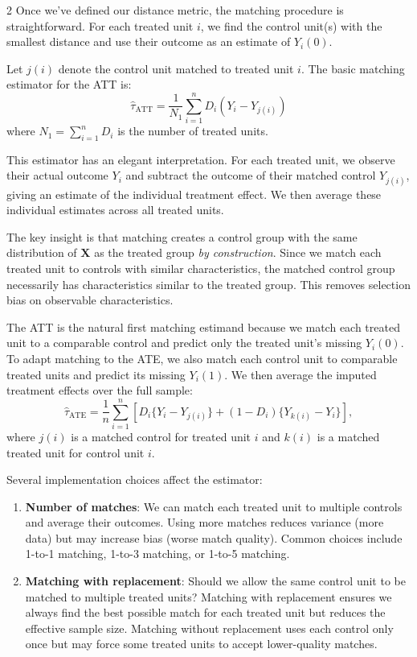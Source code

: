 \documentclass[12pt]{article}
\begin{document}
\begin{multicols}{2}
Once we've defined our distance metric, the matching procedure is straightforward.
For each treated unit $i$, we find the control unit(s) with the smallest distance and use their outcome as an estimate of $Y_i(0)$.

Let $j(i)$ denote the control unit matched to treated unit $i$.
The basic matching estimator for the ATT is:
$$\hat{\tau}_{\text{ATT}} = \frac{1}{N_1} \sum_{i=1}^n D_i (Y_i - Y_{j(i)})$$
where $N_1 = \sum_{i=1}^n D_i$ is the number of treated units.

This estimator has an elegant interpretation.
For each treated unit, we observe their actual outcome $Y_i$ and subtract the outcome of their matched control $Y_{j(i)}$, giving an estimate of the individual treatment effect.
We then average these individual estimates across all treated units.

The key insight is that matching creates a control group with the same distribution of $\bm{X}$ as the treated group \emph{by construction}.
Since we match each treated unit to controls with similar characteristics, the matched control group necessarily has characteristics similar to the treated group.
This removes selection bias on observable characteristics.

The ATT is the natural first matching estimand because we match each treated unit to a comparable control and predict only the treated unit's missing $Y_i(0)$.
To adapt matching to the ATE, we also match each control unit to comparable treated units and predict its missing $Y_i(1)$.
We then average the imputed treatment effects over the full sample:
$$
\hat{\tau}_{\text{ATE}} = \frac{1}{n} \sum_{i=1}^n \left[D_i\{Y_i - Y_{j(i)}\} + (1-D_i)\{Y_{k(i)} - Y_i\}\right],
$$
where $j(i)$ is a matched control for treated unit $i$ and $k(i)$ is a matched treated unit for control unit $i$.

Several implementation choices affect the estimator:
\begin{enumerate}
  \item \textbf{Number of matches}: We can match each treated unit to multiple controls and average their outcomes.
  Using more matches reduces variance (more data) but may increase bias (worse match quality).
  Common choices include 1-to-1 matching, 1-to-3 matching, or 1-to-5 matching.

  \item \textbf{Matching with replacement}: Should we allow the same control unit to be matched to multiple treated units?
  Matching with replacement ensures we always find the best possible match for each treated unit but reduces the effective sample size.
  Matching without replacement uses each control only once but may force some treated units to accept lower-quality matches.


\end{enumerate}
\end{multicols}
\end{document}
